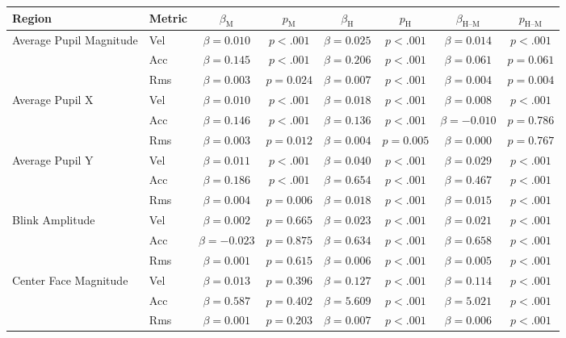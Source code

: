 \begin{tabular}{llcc|cc|cc}
\toprule
Region & Metric & $\beta_{\text{M}}$ & $p_{\text{M}}$ & $\beta_{\text{H}}$ & $p_{\text{H}}$ & $\beta_{\text{H--M}}$ & $p_{\text{H--M}}$ \\
\midrule
\multirow{3}{*}{Average Pupil Magnitude} & Vel & $\beta = 0.010$ & $p < .001$ & $\beta = 0.025$ & $p < .001$ & $\beta = 0.014$ & $p < .001$ \\
 & Acc & $\beta = 0.145$ & $p < .001$ & $\beta = 0.206$ & $p < .001$ & $\beta = 0.061$ & $p = 0.061$ \\
 & Rms & $\beta = 0.003$ & $p = 0.024$ & $\beta = 0.007$ & $p < .001$ & $\beta = 0.004$ & $p = 0.004$ \\
\midrule
\multirow{3}{*}{Average Pupil X} & Vel & $\beta = 0.010$ & $p < .001$ & $\beta = 0.018$ & $p < .001$ & $\beta = 0.008$ & $p < .001$ \\
 & Acc & $\beta = 0.146$ & $p < .001$ & $\beta = 0.136$ & $p < .001$ & $\beta = -0.010$ & $p = 0.786$ \\
 & Rms & $\beta = 0.003$ & $p = 0.012$ & $\beta = 0.004$ & $p = 0.005$ & $\beta = 0.000$ & $p = 0.767$ \\
\midrule
\multirow{3}{*}{Average Pupil Y} & Vel & $\beta = 0.011$ & $p < .001$ & $\beta = 0.040$ & $p < .001$ & $\beta = 0.029$ & $p < .001$ \\
 & Acc & $\beta = 0.186$ & $p < .001$ & $\beta = 0.654$ & $p < .001$ & $\beta = 0.467$ & $p < .001$ \\
 & Rms & $\beta = 0.004$ & $p = 0.006$ & $\beta = 0.018$ & $p < .001$ & $\beta = 0.015$ & $p < .001$ \\
\midrule
\multirow{3}{*}{Blink Amplitude} & Vel & $\beta = 0.002$ & $p = 0.665$ & $\beta = 0.023$ & $p < .001$ & $\beta = 0.021$ & $p < .001$ \\
 & Acc & $\beta = -0.023$ & $p = 0.875$ & $\beta = 0.634$ & $p < .001$ & $\beta = 0.658$ & $p < .001$ \\
 & Rms & $\beta = 0.001$ & $p = 0.615$ & $\beta = 0.006$ & $p < .001$ & $\beta = 0.005$ & $p < .001$ \\
\midrule
\multirow{3}{*}{Center Face Magnitude} & Vel & $\beta = 0.013$ & $p = 0.396$ & $\beta = 0.127$ & $p < .001$ & $\beta = 0.114$ & $p < .001$ \\
 & Acc & $\beta = 0.587$ & $p = 0.402$ & $\beta = 5.609$ & $p < .001$ & $\beta = 5.021$ & $p < .001$ \\
 & Rms & $\beta = 0.001$ & $p = 0.203$ & $\beta = 0.007$ & $p < .001$ & $\beta = 0.006$ & $p < .001$ \\

\end{tabular}
